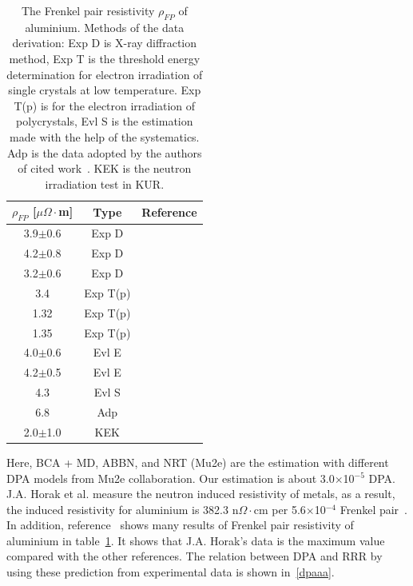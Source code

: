 \begin{table}[H]
 \centering
 \begin{tabular}{ccc} \hline \hline
  $\rho_{FP}$ [$\mu\Omega\cdot$m] & Type & Reference \\ \hline
  3.9$\pm$0.6 & Exp D & \cite{erh1} \\
  4.2$\pm$0.8 & Exp D & \cite{erh2} \\
  3.2$\pm$0.6 & Exp D & \cite{rober} \\
  3.4 & Exp T(p) & \cite{ref1} \\
  1.32 & Exp T(p) & \cite{ref2} \\
  1.35 & Exp T(p) & \cite{ref3} \\
  4.0$\pm$0.6 & Evl E & \cite{ref4} \\
  4.2$\pm$0.5 & Evl E & \cite{ref5} \\
  4.3 & Evl S & \cite{ref6} \\ 
  6.8 & Adp & \cite{horak} \\
  2.0$\pm$1.0 & KEK & \\ \hline \hline
 \end{tabular}
 \caption{The Frenkel pair resistivity $\rho_{FP}$ of aluminium. Methods of the data derivation: Exp D is X-ray diffraction method, Exp T is the threshold energy determination for electron irradiation of single crystals at low temperature. Exp T(p) is for the electron irradiation of polycrystals, Evl S is the estimation made with the help of the systematics. Adp is the data adopted by the authors of cited work~\cite{yu}. KEK is the neutron irradiation test in KUR.}
 \label{frank}
\end{table}
Here, BCA + MD, ABBN, and NRT (Mu2e) are the estimation with different DPA models from Mu2e collaboration.
Our estimation is about 3.0$\times$10$^{-5}$ DPA.
J.A. Horak et al. measure the neutron induced resistivity of metals, as a result, the induced resistivity for aluminium is 382.3 n$\Omega\cdot$cm per 5.6$\times$10$^{-4}$ Frenkel pair~\cite{horak}.
In addition, reference~\cite{yu} shows many results of Frenkel pair resistivity of aluminium in table~\ref{frank}.
It shows that J.A. Horak's data is the maximum value compared with the other references.
The relation between DPA and RRR by using these prediction from experimental data is shown in~\ref{dpaaa}.

